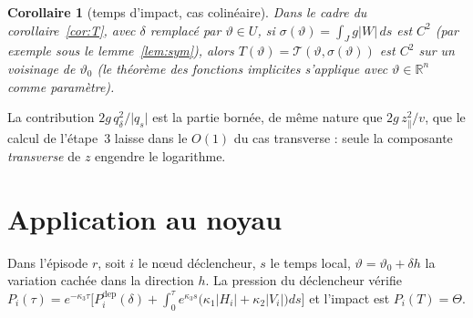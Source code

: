 \documentclass[11pt,a4paper]{article}
\newtheorem{corollaire}[theoreme]{Corollaire}
\theoremstyle{remark}
\newcommand{\R}{\mathbb R}
\newcommand{\vth}{\vartheta}
\newcommand{\dl}{\delta}
\begin{document}
\begin{corollaire}[temps d'impact, cas colinéaire]\label{cor:Tsym}
Dans le cadre du corollaire~\ref{cor:T}, avec $\dl$ remplacé par $\vth\in U$, si $\sigma(\vth)=\int_Jg\lvert W\rvert\,ds$ est $C^2$ (par exemple sous le lemme~\ref{lem:sym}), alors $T(\vth)=\mathcal T(\vth,\sigma(\vth))$ est $C^2$ sur un voisinage de $\vth_0$ (le théorème des fonctions implicites s'applique avec $\vth\in\R^n$ comme paramètre).
\end{corollaire}

\noindent La contribution $2g\,q_\dl^2/\lvert q_s\rvert$ est la partie bornée, de même nature que $2g\,z_\parallel^2/v$, que le calcul de l'étape~3 laisse dans le $O(1)$ du cas transverse : seule la composante \emph{transverse} de $z$ engendre le logarithme.

\section{Application au noyau}\label{sec:app}

Dans l'épisode $r$, soit $i$ le nœud déclencheur, $s$ le temps local, $\vth=\vth_0+\dl h$ la variation cachée dans la direction $h$. La pression du déclencheur vérifie $P_i(\tau)=e^{-\kappa_3\tau}\bigl[P_i^{\mathrm{dep}}(\dl)+\int_0^\tau e^{\kappa_3s}\bigl(\kappa_1\lvert H_i\rvert+\kappa_2\lvert V_i\rvert\bigr)ds\bigr]$ et l'impact est $P_i(T)=\Theta$.
\end{document}
